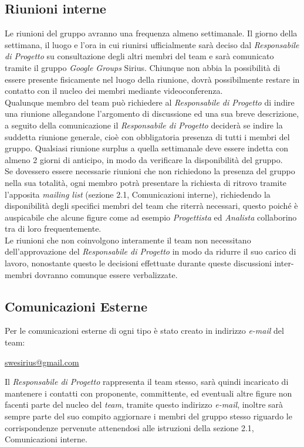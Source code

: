 \subsection{Riunioni interne}
Le riunioni del gruppo \gruppo{} avranno una frequenza almeno settimanale. Il giorno della settimana, il luogo e l'ora in cui riunirsi ufficialmente sarà deciso dal \textit{Responsabile di Progetto} su consultazione degli altri membri del team e sarà comunicato tramite il gruppo \textit{Google Groups} Sirius. Chiunque non abbia la possibilità di essere presente fisicamente nel luogo della riunione, dovrà possibilmente restare in contatto con il nucleo dei membri mediante videoconferenza.\\
Qualunque membro del team può richiedere al \textit{Responsabile di Progetto} di indire una riunione allegandone l'argomento di discussione ed una sua breve descrizione, a seguito della comunicazione il \textit{Responsabile di Progetto} deciderà se indire la suddetta riunione generale, cioè con obbligatoria presenza di tutti i membri del gruppo. Qualsiasi riunione surplus a quella settimanale deve essere indetta con almeno 2 giorni di anticipo, in modo da verificare la disponibilità del gruppo.\\
Se dovessero essere necessarie riunioni che non richiedono la presenza del gruppo nella sua totalità, ogni membro potrà presentare la richiesta di ritrovo tramite l'apposita \textit{mailing list} (sezione 2.1, Comunicazioni interne), richiedendo la disponibilità degli specifici membri del team che riterrà necessari, questo poiché è auspicabile che alcune figure come ad esempio \textit{Progettista} ed \textit{Analista} collaborino tra di loro frequentemente.\\
Le riunioni che non coinvolgono interamente il team non necessitano dell'approvazione del \textit{Responsabile di Progetto} in modo da ridurre il suo carico di lavoro, nonostante questo le decisioni effettuate durante queste discussioni inter-membri dovranno comunque essere verbalizzate.

\subsection{Comunicazioni Esterne}
Per le comunicazioni esterne di ogni tipo è stato creato in indirizzo \textit{e-mail} del team:
\begin{center}
\href{swesirius@gmail.com}{swesirius@gmail.com}
\end{center}

Il \textit{Responsabile di Progetto} rappresenta il team stesso, sarà quindi incaricato di mantenere i contatti con proponente, committente, ed eventuali altre figure non facenti parte del nucleo del \textit{team}, tramite questo indirizzo \textit{e-mail}, inoltre sarà sempre parte del suo compito aggiornare i membri del gruppo stesso riguardo le corrispondenze pervenute attenendosi alle istruzioni della sezione 2.1, Comunicazioni interne.

